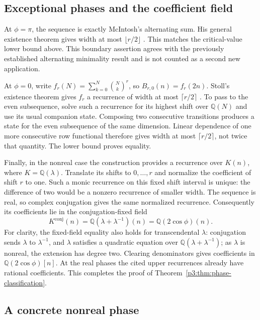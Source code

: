 \documentclass[11pt,a4paper]{article}
\theoremstyle{definition}
\theoremstyle{remark}
\numberwithin{equation}{section}
\begin{document}
\subsection{Exceptional phases and the coefficient field}

At $\phi=\pi$, the sequence is exactly McIntosh's alternating sum.
His general existence theorem gives width at most $\lfloor r/2\rfloor$
\cite[Theorem~1]{p3:McIntosh1993}. This matches the critical-value lower
bound above. This boundary assertion agrees with the previously
established alternating minimality result and is not counted as a
second new application.

At $\phi=0$, write
$f_r(N)=\sum_{k=0}^{N}\binom Nk^r$, so $B_{r,0}(n)=f_r(2n)$.
Stoll's existence theorem gives $f_r$ a recurrence of width at most
$\lceil r/2\rceil$ \cite{p3:Stoll1997}. To pass to the even subsequence,
solve such a recurrence for its highest shift over $\mathbb Q(N)$
and use its usual companion state. Composing two consecutive
transitions produces a state for the even subsequence of the same
dimension. Linear dependence of one more consecutive row functional
therefore gives width at most $\lceil r/2\rceil$, not twice that
quantity. The lower bound proves equality.

Finally, in the nonreal case the construction provides a recurrence
over $K(n)$, where $K=\mathbb Q(\lambda)$. Translate its shifts to
$0,\ldots,r$ and normalize the coefficient of shift $r$ to one.
Such a monic recurrence on this fixed shift interval is unique:
the difference of two would be a nonzero recurrence of smaller width.
The sequence is
real, so complex conjugation gives the same normalized recurrence.
Consequently its coefficients lie in the conjugation-fixed field
\[
 K^{\mathrm{conj}}(n)
 =\mathbb Q(\lambda+\lambda^{-1})(n)
 =\mathbb Q(2\cos\phi)(n).
\]
For clarity, the fixed-field equality also holds for transcendental
$\lambda$: conjugation sends $\lambda$ to $\lambda^{-1}$, and
$\lambda$ satisfies a quadratic equation over
$\mathbb Q(\lambda+\lambda^{-1})$; as $\lambda$ is nonreal, the
extension has degree two. Clearing denominators gives coefficients
in $\mathbb Q(2\cos\phi)[n]$. At the real phases the cited upper
recurrences already have rational coefficients. This completes
the proof of Theorem~\ref{p3:thm:phase-classification}.

\subsection{A concrete nonreal phase}
\end{document}
